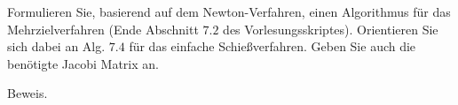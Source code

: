 \begin{exercise}
  Formulieren Sie, basierend auf dem Newton-Verfahren, einen Algorithmus für das
  Mehrzielverfahren (Ende Abschnitt $7.2$ des Vorlesungsskriptes). Orientieren
  Sie sich dabei an Alg. $7.4$ für das einfache Schießverfahren. Geben Sie auch
  die benötigte Jacobi Matrix an.
\end{exercise}

\begin{solution}
  Beweis.
\end{solution}
